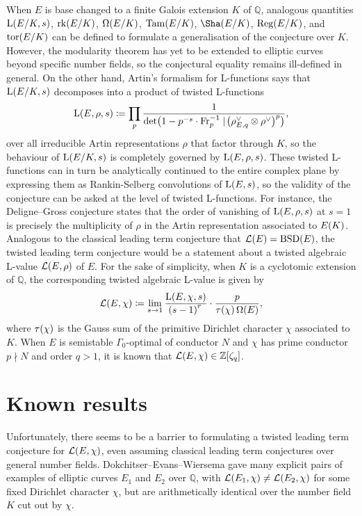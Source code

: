 \documentclass{article}
\theoremstyle{plain}
\theoremstyle{definition}
\newcommand{\BSD}{\mathrm{BSD}}
\newcommand{\Fr}{\mathrm{Fr}}
\renewcommand{\L}{\mathrm{L}}
\newcommand{\LLL}{\mathcal{L}}
\newcommand{\QQ}{\mathbb{Q}}
\newcommand{\Reg}{\mathrm{Reg}}
\newcommand{\rk}{\mathrm{rk}}
\newcommand{\Tam}{\mathrm{Tam}}
\newcommand{\tor}{\mathrm{tor}}
\newcommand{\ZZ}{\mathbb{Z}}
\newcommand{\br}{\!\del}
\begin{document}
When $ E $ is base changed to a finite Galois extension $ K $ of $ \QQ $, analogous quantities $ \L\br[0]{E / K, s} $, $ \rk\br[0]{E / K} $, $ \Omega\br[0]{E / K} $, $ \Tam\br[0]{E / K} $, $ \Sha\br[0]{E / K} $, $ \Reg\br[0]{E / K} $, and $ \tor\br[0]{E / K} $ can be defined to formulate a generalisation of the conjecture over $ K $. However, the modularity theorem has yet to be extended to elliptic curves beyond specific number fields, so the conjectural equality remains ill-defined in general. On the other hand, Artin's formalism for L-functions says that $ \L\br[0]{E / K, s} $ decomposes into a product of twisted L-functions
$$ \L\br{E, \rho, s} \coloneqq \prod_p \dfrac{1}{\det\br[1]{1 - p^{-s} \cdot \Fr_p^{-1} \mid \br[1]{\rho_{E, q}^\vee \otimes \rho^\vee}^p}}, $$
over all irreducible Artin representations $ \rho $ that factor through $ K $, so the behaviour of $ \L\br[0]{E / K, s} $ is completely governed by $ \L\br{E, \rho, s} $. These twisted L-functions can in turn be analytically continued to the entire complex plane by expressing them as Rankin-Selberg convolutions of $ \L\br{E, s} $, so the validity of the conjecture can be asked at the level of twisted L-functions. For instance, the Deligne--Gross conjecture states that the order of vanishing of $ \L\br{E, \rho, s} $ at $ s = 1 $ is precisely the multiplicity of $ \rho $ in the Artin representation associated to $ E\br{K} $. Analogous to the classical leading term conjecture that $ \LLL\br{E} = \BSD\br{E} $, the twisted leading term conjecture would be a statement about a twisted algebraic L-value $ \LLL\br{E, \rho} $ of $ E $. For the sake of simplicity, when $ K $ is a cyclotomic extension of $ \QQ $, the corresponding twisted algebraic L-value is given by
$$ \LLL\br{E, \chi} \coloneqq \lim_{s \to 1} \dfrac{\L\br{E, \chi, s}}{\br{s - 1}^r} \cdot \dfrac{p}{\tau\br{\chi}\Omega\br{E}}, $$
where $ \tau\br{\chi} $ is the Gauss sum of the primitive Dirichlet character $ \chi $ associated to $ K $. When $ E $ is semistable $ \Gamma_0 $-optimal of conductor $ N $ and $ \chi $ has prime conductor $ p \nmid N $ and order $ q > 1 $, it is known that $ \LLL\br{E, \chi} \in \ZZ\sbr[0]{\zeta_q} $.

\pagebreak

\section{Known results}

Unfortunately, there seems to be a barrier to formulating a twisted leading term conjecture for $ \LLL\br{E, \chi} $, even assuming classical leading term conjectures over general number fields. Dokchitser--Evans--Wiersema gave many explicit pairs of examples of elliptic curves $ E_1 $ and $ E_2 $ over $ \QQ $, with $ \LLL\br{E_1, \chi} \ne \LLL\br{E_2, \chi} $ for some fixed Dirichlet character $ \chi $, but are arithmetically identical over the number field $ K $ cut out by $ \chi $.
\end{document}
